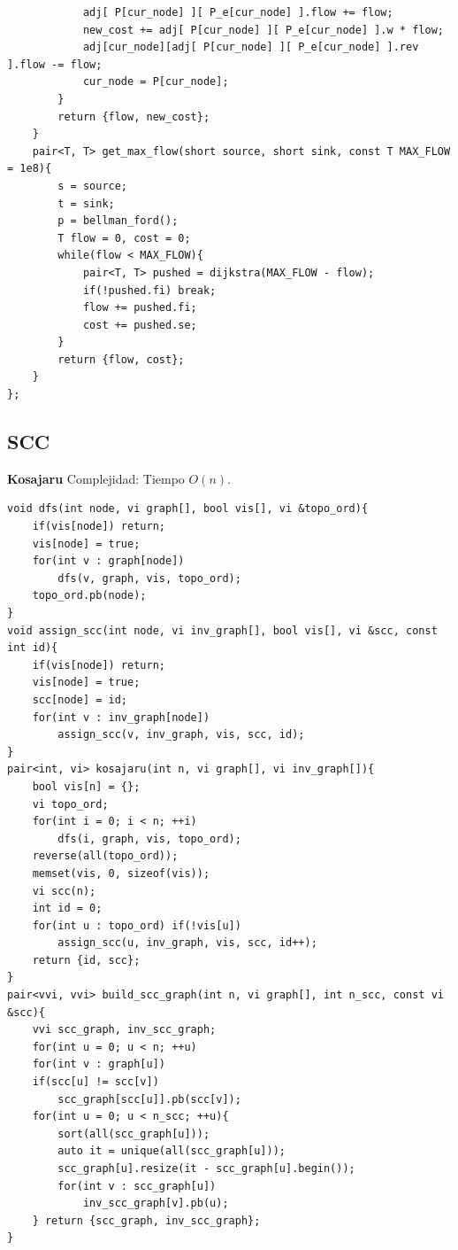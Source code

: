 \documentclass[10pt,spanish,mexico]{article}
\numberwithin{equation}{section}
\begin{document}
\begin{multicols}{2}
\begin{verbatim}
            adj[ P[cur_node] ][ P_e[cur_node] ].flow += flow;
            new_cost += adj[ P[cur_node] ][ P_e[cur_node] ].w * flow;
            adj[cur_node][adj[ P[cur_node] ][ P_e[cur_node] ].rev ].flow -= flow;
            cur_node = P[cur_node];
        }
        return {flow, new_cost};
    }
    pair<T, T> get_max_flow(short source, short sink, const T MAX_FLOW = 1e8){
        s = source;
        t = sink;
        p = bellman_ford();
        T flow = 0, cost = 0;
        while(flow < MAX_FLOW){
            pair<T, T> pushed = dijkstra(MAX_FLOW - flow);
            if(!pushed.fi) break;
            flow += pushed.fi;
            cost += pushed.se;
        }
        return {flow, cost};
    }
};
\end{verbatim}

\vspace{-1.2\baselineskip}
\hrulefill
\subsection{SCC}
\textbf{Kosajaru}
Complejidad: Tiempo $O(n)$.
\begin{verbatim}
void dfs(int node, vi graph[], bool vis[], vi &topo_ord){
    if(vis[node]) return;
    vis[node] = true;
    for(int v : graph[node])
        dfs(v, graph, vis, topo_ord);
    topo_ord.pb(node);
}
void assign_scc(int node, vi inv_graph[], bool vis[], vi &scc, const int id){
    if(vis[node]) return;
    vis[node] = true;
    scc[node] = id;
    for(int v : inv_graph[node])
        assign_scc(v, inv_graph, vis, scc, id);
}
pair<int, vi> kosajaru(int n, vi graph[], vi inv_graph[]){
    bool vis[n] = {};
    vi topo_ord;
    for(int i = 0; i < n; ++i)
        dfs(i, graph, vis, topo_ord);
    reverse(all(topo_ord));
    memset(vis, 0, sizeof(vis));
    vi scc(n);
    int id = 0;
    for(int u : topo_ord) if(!vis[u])
        assign_scc(u, inv_graph, vis, scc, id++);
    return {id, scc};
}
pair<vvi, vvi> build_scc_graph(int n, vi graph[], int n_scc, const vi &scc){
    vvi scc_graph, inv_scc_graph;
    for(int u = 0; u < n; ++u)
    for(int v : graph[u])
    if(scc[u] != scc[v])
        scc_graph[scc[u]].pb(scc[v]);
    for(int u = 0; u < n_scc; ++u){
        sort(all(scc_graph[u]));
        auto it = unique(all(scc_graph[u]));
        scc_graph[u].resize(it - scc_graph[u].begin());
        for(int v : scc_graph[u])
            inv_scc_graph[v].pb(u);
    } return {scc_graph, inv_scc_graph};
}
\end{verbatim}

\vspace{-1.2\baselineskip}
\hrulefill

\end{multicols}
\end{document}
